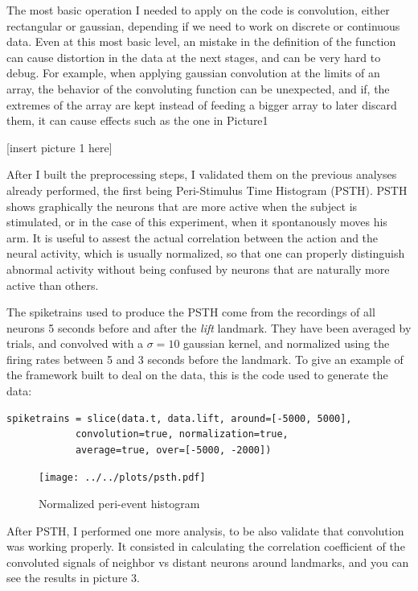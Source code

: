 The most basic operation I needed to apply on the code is convolution, either rectangular or gaussian, depending if we need to work on discrete or continuous data. Even at this most basic level, an mistake in the definition of the function can cause distortion in the data at the next stages, and can be very hard to debug. For example, when applying gaussian convolution at the limits of an array, the behavior of the convoluting function can be unexpected, and if, the extremes of the array are kept instead of feeding a bigger array to later discard them, it can cause effects such as the one in Picture1

[insert picture 1 here]

After I built the preprocessing steps, I validated them on the previous analyses already performed, the first being Peri-Stimulus Time Histogram (PSTH). PSTH shows graphically the neurons that are more active when the subject is stimulated, or in the case of this experiment, when it spontanously moves his arm. It is useful to assest the actual correlation between the action and the neural activity, which is usually normalized, so that one can properly distinguish abnormal activity without being confused by neurons that are naturally more active than others.

The spiketrains used to produce the PSTH come from the recordings of all neurons 5 seconds before and after the \emph{lift} landmark. They have been averaged by trials, and convolved with a $\sigma=10$ gaussian kernel, and normalized using the firing rates between 5 and 3 seconds before the landmark. To give an example of the framework built to deal on the data, this is the code used to generate the data:
\begin{lstlisting}[frame=single]
spiketrains = slice(data.t, data.lift, around=[-5000, 5000], 
		    convolution=true, normalization=true, 
		    average=true, over=[-5000, -2000])
\end{lstlisting}
\begin{figure}[h]
	\centering
	\texttt{[image: ../../plots/psth.pdf]}
	\caption{Normalized peri-event histogram}
	\label{fig:psth}
\end{figure}


After PSTH, I performed one more analysis, to be also validate that convolution was working properly. It consisted in calculating the correlation coefficient of the convoluted signals of neighbor vs distant neurons around landmarks, and you can see the results in picture 3.

